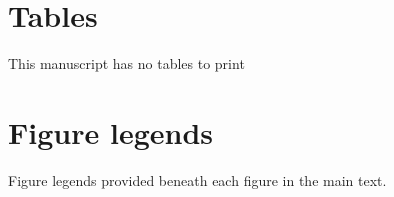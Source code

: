 \documentclass[11pt]{article}
\begin{document}
%
%
\newpage{}




\renewcommand\thesection{}
\renewcommand\thesubsection{}

\section{Tables}
\renewcommand{\thetable}{\arabic{table}}
\setcounter{table}{0}

This manuscript has no tables to print

\section{Figure legends}

Figure legends provided beneath each figure in the main text.


\end{document}
